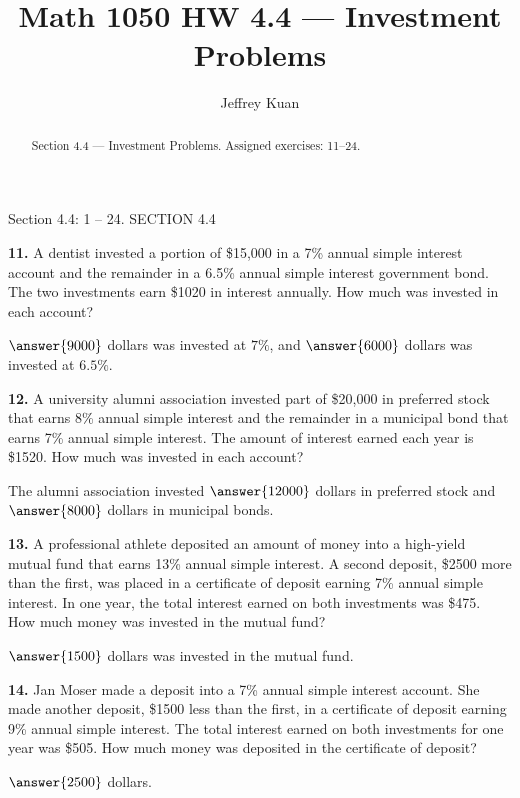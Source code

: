 \documentclass{ximera}
\author{Jeffrey Kuan}
\title{Math 1050 HW 4.4 --- Investment Problems}
\begin{document}
\begin{abstract}
    Section 4.4 --- Investment Problems.
    Assigned exercises: 11–24.
\end{abstract}

\maketitle

Section 4.4: 1 – 24. SECTION 4.4

\begin{problem}
\textbf{11.} A dentist invested a portion of \$15,000 in a 7\% annual simple interest account
  and the remainder in a 6.5\% annual simple interest government bond. The two
  investments earn \$1020 in interest annually. How much was invested in each account?

\( \answer{9000} \) dollars was invested at \( 7 \% \), and \( \answer{6000} \) dollars was invested at \( 6.5 \% \).
\end{problem}

\begin{problem}
\textbf{12.} A university alumni association invested part of \$20,000 in preferred stock that
  earns 8\% annual simple interest and the remainder in a municipal bond that earns 7\%
  annual simple interest. The amount of interest earned each year is \$1520. How much was
  invested in each account?

The alumni association invested \( \answer{12000} \) dollars in preferred stock and \( \answer{8000} \) dollars in municipal bonds.
\end{problem}

\begin{problem}
\textbf{13.} A professional athlete deposited an amount of money into a high-yield mutual fund
  that earns 13\% annual simple interest. A second deposit, \$2500 more than the first,
  was placed in a certificate of deposit earning 7\% annual simple interest. In one year,
  the total interest earned on both investments was \$475. How much money was invested in
  the mutual fund?

\( \answer{1500} \) dollars was invested in the mutual fund.
\end{problem}

\begin{problem}
\textbf{14.} Jan Moser made a deposit into a 7\% annual simple interest account. She made
  another deposit, \$1500 less than the first, in a certificate of deposit earning 9\%
  annual simple interest. The total interest earned on both investments for one year was
  \$505. How much money was deposited in the certificate of deposit?

\( \answer{2500} \) dollars.
\end{problem}
\end{document}
